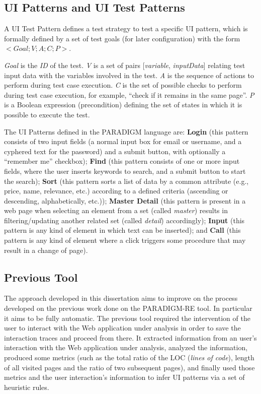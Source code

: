 \documentclass[9pt,a4paper]{extarticle}
\begin{document}
\begin{multicols}{2}
\subsection{UI Patterns and UI Test Patterns}

A UI Test Pattern defines a test strategy to test a specific UI pattern, which is formally defined by a set of test goals (for later configuration) with the form $< Goal; V; A; C; P >$. 

\textit{Goal} is the \textit{ID} of the test. \textit{V} is a set of pairs { [\textit{variable}, \textit{inputData}] } relating test input data with the variables involved in the test. \textit{A} is the sequence of actions to perform during test case execution. \textit{C} is the set of possible checks to perform during test case execution, for example, “check if it remains in the same page”. \textit{P} is a Boolean expression (precondition) defining the set of states in which it is possible to execute the test. 

The UI Patterns defined in the PARADIGM language are: \textbf{Login} (this pattern consists of two input fields (a normal input box for email or username, and a cyphered text for the password) and a submit button, with optionally a ``remember me'' checkbox); \textbf{Find} (this pattern consists of one or more input fields, where the user inserts keywords to search, and a submit button to start the search); \textbf{Sort} (this pattern sorts a list of data by a common attribute (e.g., price, name, relevance, etc.) according to a defined criteria (ascending or descending, alphabetically, etc.)); \textbf{Master Detail} (this pattern is present in a web page when selecting an element from a set (called \textit{master}) results in filtering/updating another related set (called \textit{detail}) accordingly); \textbf{Input} (this pattern is any kind of element in which text can be inserted); and \textbf{Call} (this pattern is any kind of element where a click triggers some procedure that may result in a change of page).
\subsection{Previous Tool}
The  approach developed in this dissertation aims to improve on the process developed on the previous work \cite{nabuco2013inferring} done on the PARADIGM-RE tool. In particular it aims to be fully automatic. The previous tool required the intervention of the user to interact with the Web application under analysis in order to save the interaction traces and proceed from there. It extracted information from an user's interaction with the Web application under analysis, analyzed the information, produced some metrics (such as the total ratio of the LOC (\textit{lines of code}), length of all visited pages and the ratio of two subsequent pages), and finally used those metrics and the user interaction's information to infer UI patterns via a set of heuristic rules. 


\end{multicols}
\end{document}
